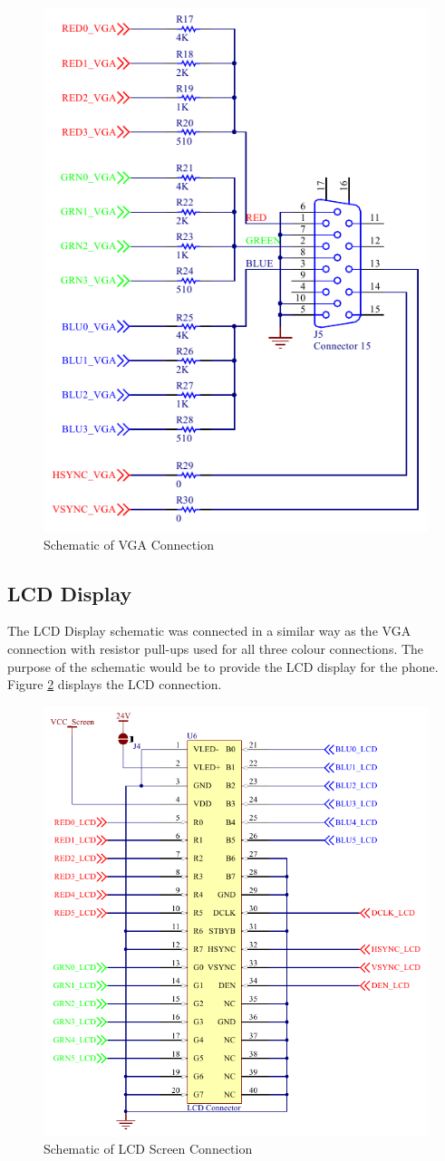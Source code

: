 \begin{figure}
	\includegraphics[width=0.5\linewidth]{Figures/VGA.pdf}\centering
	\caption{Schematic of VGA Connection}
	\label{fig:VGA}
\end{figure}

\subsection{LCD Display}
\label{chap:LCD}

	The LCD Display schematic was connected in a similar way as the VGA connection with resistor pull-ups used for all three colour connections. 
The purpose of the schematic would be to provide the LCD display for the phone.
Figure \ref{fig:LCD} displays the LCD connection.

\begin{figure}
	\includegraphics[width=0.5\linewidth]{Figures/LCD.pdf}\centering
	\caption{Schematic of LCD Screen Connection}
	\label{fig:LCD}
\end{figure}

